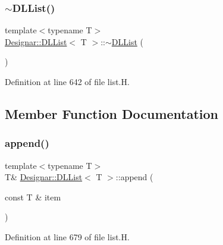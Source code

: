 \mbox{\label{class_designar_1_1_d_l_list_a095cfa30b7eba01f1dc7e3fe6d35f013}} 
\subsubsection{\texorpdfstring{$\sim$\+D\+L\+List()}{~DLList()}}
{\footnotesize\ttfamily template$<$typename T$>$ \\
\hyperlink{class_designar_1_1_d_l_list}{Designar\+::\+D\+L\+List}$<$ T $>$\+::$\sim$\hyperlink{class_designar_1_1_d_l_list}{D\+L\+List} (\begin{DoxyParamCaption}{ }\end{DoxyParamCaption})\hspace{0.3cm}{\ttfamily [inline]}}



Definition at line 642 of file list.\+H.



\subsection{Member Function Documentation}
\mbox{\label{class_designar_1_1_d_l_list_a0999bcc1ce1d5b89d54c9993735dc469}} 
\subsubsection{\texorpdfstring{append()}{append()}\hspace{0.1cm}{\footnotesize\ttfamily [1/2]}}
{\footnotesize\ttfamily template$<$typename T$>$ \\
T\& \hyperlink{class_designar_1_1_d_l_list}{Designar\+::\+D\+L\+List}$<$ T $>$\+::append (\begin{DoxyParamCaption}\item[{const T \&}]{item }\end{DoxyParamCaption})\hspace{0.3cm}{\ttfamily [inline]}}



Definition at line 679 of file list.\+H.

